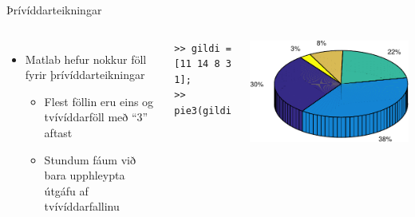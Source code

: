 \documentclass[handout]{beamer}
\begin{document}
\begin{frame}[fragile]{Þrívíddarteikningar}
\begin{columns}
\begin{itemize}
 \item Matlab hefur nokkur föll fyrir þrívíddarteikningar
 \begin{itemize}
  \item Flest föllin eru eins og tvívíddarföll með ``3'' aftast
  \item Stundum fáum við bara upphleypta útgáfu af tvívíddarfallinu
 \end{itemize}
\end{itemize}
\begin{verbatim}
>> gildi = [11 14 8 3 1];
>> pie3(gildi)
\end{verbatim}

\includegraphics[width=\linewidth]{Pics/3dpie}
\end{columns}
\end{frame}
\end{document}
